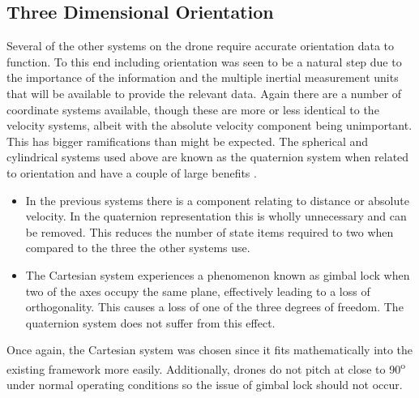 \subsection{Three Dimensional Orientation}
Several of the other systems on the drone require accurate orientation data to function. To this end including orientation was seen to be a natural step due to the importance of the information and the multiple inertial measurement units that will be available to provide the relevant data. Again there are a number of coordinate systems available, though these are more or less identical to the velocity systems, albeit with the absolute velocity component being unimportant. This has bigger ramifications than might be expected. The spherical and cylindrical systems used above are known as the quaternion system when related to orientation and have a couple of large benefits \cite{grossekatthofer2012introduction}\cite{grassia1998practical}.
\begin{itemize}
\item In the previous systems there is a  component relating to distance or absolute velocity. In the quaternion representation this is wholly unnecessary and can be removed. This reduces the number of state items required to two when compared to the three the other systems use.
\item The Cartesian system experiences a phenomenon known as gimbal lock when two of the axes occupy the same plane, effectively leading to a loss of orthogonality. This causes a loss of one of the three degrees of freedom. The quaternion system does not suffer from this effect.
\end{itemize}

Once again, the Cartesian system was chosen since it fits mathematically into the existing framework more easily. Additionally, drones do not pitch at close to 90\textsuperscript{o} under normal operating conditions so the issue of gimbal lock should not occur.
























